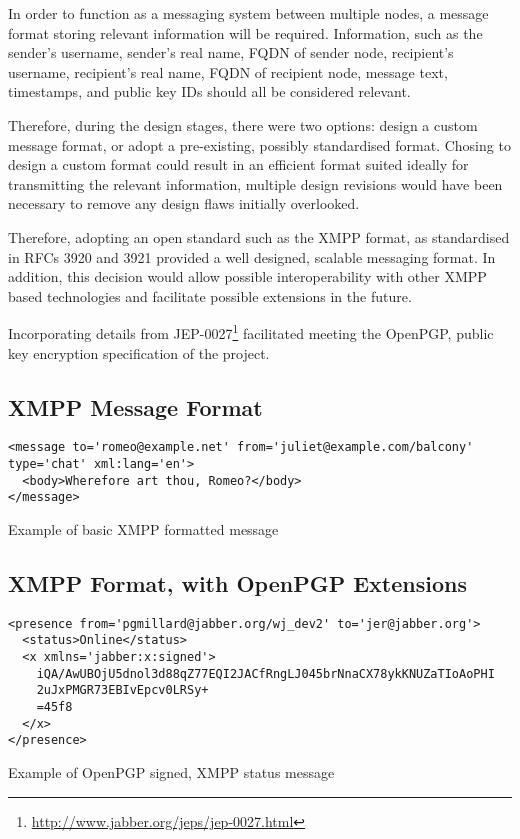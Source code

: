 
In order to function as a messaging system between multiple nodes, a
message format storing relevant information will be required. 
Information, such as the sender's username, sender's real name, FQDN of 
sender node, recipient's username, recipient's real name, FQDN of 
recipient node, message text, timestamps, and public key IDs should all
be considered relevant. 


Therefore, during the design stages, there were two options: design a 
custom message format, or adopt a pre-existing, possibly standardised 
format. Chosing to design a custom format could result in an efficient 
format suited ideally for transmitting the relevant information, 
multiple design revisions would have been necessary to remove any
design flaws initially overlooked. 


Therefore, adopting an open standard such as the XMPP format, as 
standardised in RFCs 3920 and 3921 provided a well designed, scalable 
messaging format. In addition, this decision would allow possible 
interoperability with other XMPP based technologies and facilitate 
possible extensions in the future.


Incorporating details from
JEP-0027\footnote{\url{http://www.jabber.org/jeps/jep-0027.html}} 
facilitated meeting the OpenPGP, public key encryption 
specification of the project.

\subsection{XMPP Message Format}

\begin{table}[hbt]

\begin{verbatim}
<message to='romeo@example.net' from='juliet@example.com/balcony' 
type='chat' xml:lang='en'>
  <body>Wherefore art thou, Romeo?</body>
</message>
\end{verbatim}

\caption{Example of basic XMPP formatted message}

\end{table}


\subsection{XMPP Format, with OpenPGP Extensions}


\begin{table}[hbt]

\begin{verbatim}
<presence from='pgmillard@jabber.org/wj_dev2' to='jer@jabber.org'>
  <status>Online</status>
  <x xmlns='jabber:x:signed'>
    iQA/AwUBOjU5dnol3d88qZ77EQI2JACfRngLJ045brNnaCX78ykKNUZaTIoAoPHI
    2uJxPMGR73EBIvEpcv0LRSy+
    =45f8
  </x>
</presence>
\end{verbatim}

\caption{Example of OpenPGP signed, XMPP status message}

\end{table}


